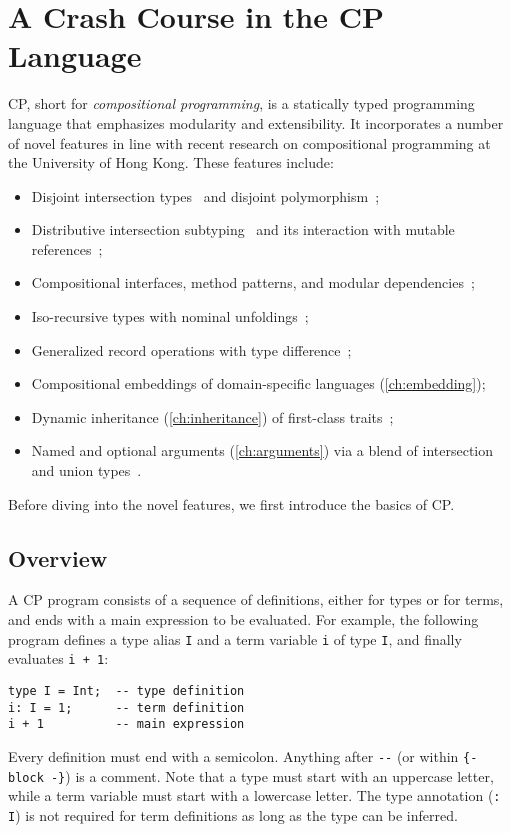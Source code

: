 \chapter{A Crash Course in the CP Language} \label{ch:cp}

CP, short for \emph{compositional programming}, is a statically typed
programming language that emphasizes modularity and extensibility. It
incorporates a number of novel features in line with recent research on
compositional programming at the University of Hong Kong. These features
include:
\begin{itemize}
\item Disjoint intersection types~\citep{oliveira2016disjoint} and disjoint
      polymorphism~\citep{alpuim2017disjoint,xie2020row};
\item Distributive intersection subtyping~\citep{bi2018essence,bi2019distributive}
      and its interaction with mutable references~\citep{ye2024imperative};
\item Compositional interfaces, method patterns, and modular
      dependencies~\citep{zhang2021compositional};
\item Iso-recursive types with nominal unfoldings~\citep{zhou2022calculus};
\item Generalized record operations with type difference~\citep{xu2023making};
\item Compositional embeddings of domain-specific languages
      (\autoref{ch:embedding});
\item Dynamic inheritance (\autoref{ch:inheritance}) of first-class
      traits~\citep{bi2018typed};
\item Named and optional arguments (\autoref{ch:arguments}) via a blend of
      intersection and union types~\citep{rehman2023blend}.
\end{itemize}
Before diving into the novel features, we first introduce the basics of CP.

\section{Overview}

A CP program consists of a sequence of definitions, either for types or for
terms, and ends with a main expression to be evaluated. For example, the
following program defines a type alias \lstinline{I} and a term variable
\lstinline{i} of type \lstinline{I}, and finally evaluates \lstinline{i + 1}:
\begin{lstlisting}[xleftmargin=.3\textwidth]
type I = Int;  -- type definition
i: I = 1;      -- term definition
i + 1          -- main expression
\end{lstlisting}
Every definition must end with a semicolon.
Anything after \lstinline{--} (or within \lstinline|{- block -}|) is a comment.
Note that a type must start with an uppercase letter, while a term variable must
start with a lowercase letter. The type annotation (\lstinline{: I}) is not
required for term definitions as long as the type can be inferred.

